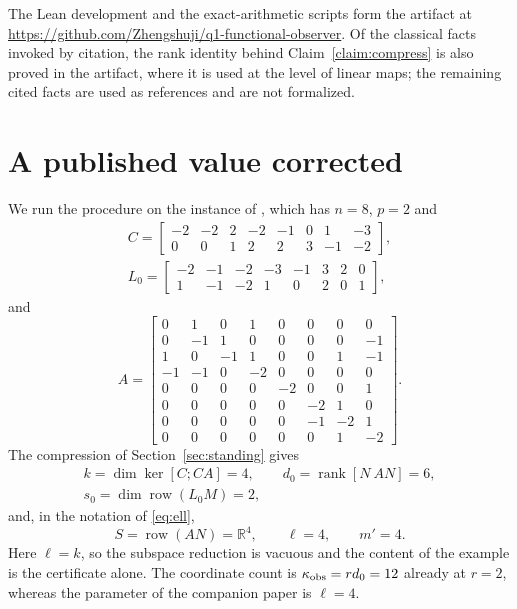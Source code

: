 ﻿\documentclass[journal]{IEEEtran}
\theoremstyle{plainn}
\theoremstyle{remark}
\begin{document}
The Lean development and the exact-arithmetic scripts form the artifact at
\url{https://github.com/Zhengshuji/q1-functional-observer}. Of the classical facts invoked by citation,
the rank identity behind Claim~\ref{claim:compress} is also proved in the artifact, where it is used at the
level of linear maps; the remaining cited facts are used as references and are not formalized.

\appendices

\section{A published value corrected}\label{app:example}

We run the procedure on the instance of \cite[Sec.~VII]{fer26b}, which has $n=8$, $p=2$ and
\begin{equation*}
\begin{gathered}
C=\begin{bmatrix}-2&-2&2&-2&-1&0&1&-3\\ 0&0&1&2&2&3&-1&-2\end{bmatrix},\\
L_0=\begin{bmatrix}-2&-1&-2&-3&-1&3&2&0\\ 1&-1&-2&1&0&2&0&1\end{bmatrix},
\end{gathered}
\end{equation*}
and
\begin{equation*}
A=\begin{bmatrix}
0&1&0&1&0&0&0&0\\
0&-1&1&0&0&0&0&-1\\
1&0&-1&1&0&0&1&-1\\
-1&-1&0&-2&0&0&0&0\\
0&0&0&0&-2&0&0&1\\
0&0&0&0&0&-2&1&0\\
0&0&0&0&0&-1&-2&1\\
0&0&0&0&0&0&1&-2
\end{bmatrix}.
\end{equation*}
The compression of Section~\ref{sec:standing} gives
\begin{equation*}
\begin{gathered}
k=\dim\ker[C;CA]=4,\qquad d_0=\operatorname{rank}[N\ AN]=6,\\
s_0=\dim\operatorname{row}(L_0M)=2,
\end{gathered}
\end{equation*}
and, in the notation of \eqref{eq:ell},
\begin{equation*}
S=\operatorname{row}(AN)=\mathbb R^4,\qquad \ell=4,\qquad m'=4 .
\end{equation*}
Here $\ell=k$, so the subspace reduction is vacuous and the content of the example is the
certificate alone. The coordinate count is $\kappa_{\rm obs}=rd_0=12$ already at $r=2$, whereas
the parameter of the companion paper is $\ell=4$.
\end{document}
